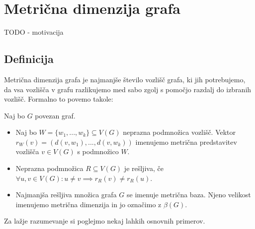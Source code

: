 \documentclass[mat1, tisk]{fmfdelo}
\newcommand{\1}{(1, 1, ..., 1)}
\newcommand{\2}{(2, 2, ..., 2)}
\begin{document}
\section{Metrična dimenzija grafa} \label{s:mdim}

TODO - motivacija



\subsection{Definicija} \label{ss:def_mdim}

Metrična dimenzija grafa je najmanjše število vozlišč grafa, ki jih potrebujemo, da
vsa vozlišča v grafu razlikujemo med sabo zgolj s pomočjo razdalj do izbranih vozlišč.
Formalno to povemo takole:

\begin{definicija} \label{def:metricna_dimenzija}
    Naj bo $G$ povezan graf. 
    \begin{itemize}
        \item Naj bo $W = \{ w_1, ... , w_k  \} \subseteq V(G)$ neprazna podmnožica vozlišč. 
        Vektor $r_W(v) = (d(v, w_1), ..., d(v, w_k))$ imenujemo metrična 
        predstavitev vozlišča $v \in V(G)$ s podmnožico $W$.
        \item Neprazna podmnožica $R \subseteq V(G)$ je rešljiva,
        če $\forall u, v \in V(G): u \neq v \implies r_R(v) \neq r_R(u)$.
        \item Najmanjša rešljiva množica grafa $G$ se imenuje metrična baza. Njeno velikost imenujemo 
        metrična dimenzija in jo označimo z $\beta(G).$
    \end{itemize}
    
    

     
\end{definicija}

Za lažje razumevanje si poglejmo nekaj lahkih osnovnih primerov.
\end{document}
